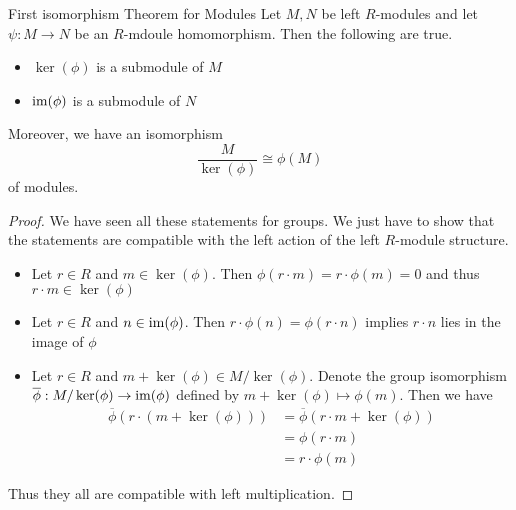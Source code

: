 \documentclass[a4paper]{article}
\begin{document}
\begin{thm}{First isomorphism Theorem for Modules}{} Let $M,N$ be left $R$-modules and let $\psi:M\to N$ be an $R$-mdoule homomorphism. Then the following are true. 
\begin{itemize}
\item $\ker(\phi)$ is a submodule of $M$
\item $\operatorname{im}(\phi)$ is a submodule of $N$
\end{itemize}
Moreover, we have an isomorphism $$\frac{M}{\ker(\phi)}\cong\phi(M)$$ of modules. 
 \tcbline
\begin{proof}
We have seen all these statements for groups. We just have to show that the statements are compatible with the left action of the left $R$-module structure. 
\begin{itemize}
\item Let $r\in R$ and $m\in\ker(\phi)$. Then $\phi(r\cdot m)=r\cdot\phi(m)=0$ and thus $r\cdot m\in\ker(\phi)$
\item Let $r\in R$ and $n\in\operatorname{im}(\phi)$. Then $r\cdot\phi(n)=\phi(r\cdot n)$ implies $r\cdot n$ lies in the image of $\phi$
\item Let $r\in R$ and $m+\ker(\phi)\in M/\ker(\phi)$. Denote the group isomorphism $\overline{\phi}:M/\ker(\phi)\to\operatorname{im}(\phi)$ defined by $m+\ker(\phi)\mapsto\phi(m)$. Then we have 
\begin{align*}
\overline{\phi}(r\cdot(m+\ker(\phi)))&=\overline{\phi}(r\cdot m+\ker(\phi))\\
&=\phi(r\cdot m)\\
&=r\cdot\phi(m)
\end{align*}
\end{itemize}
Thus they all are compatible with left multiplication. 
\end{proof}
\end{thm}
\end{document}
